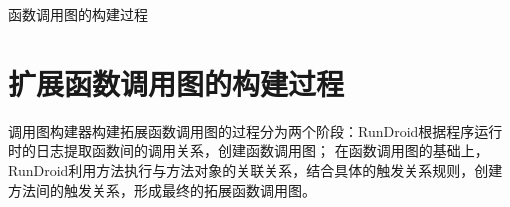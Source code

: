 \begin{algorithm}[!ht]
	\caption{函数调用图的构建过程} 
	\label{alg:instrument}
	
	
\end{algorithm}

\section{扩展函数调用图的构建过程}

调用图构建器构建拓展函数调用图的过程分为两个阶段：RunDroid根据程序运行时的日志提取函数间的调用关系，创建函数调用图；
在函数调用图的基础上，RunDroid利用方法执行与方法对象的关联关系，结合具体的触发关系规则，创建方法间的触发关系，形成最终的拓展函数调用图。


